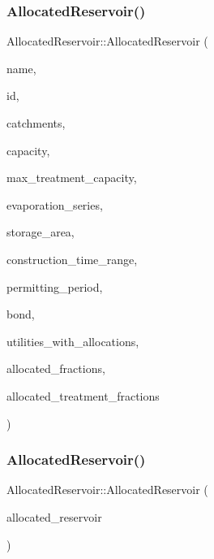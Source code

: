 \subsubsection{\texorpdfstring{Allocated\+Reservoir()}{AllocatedReservoir()}\hspace{0.1cm}{\footnotesize\ttfamily [4/5]}}
{\footnotesize\ttfamily Allocated\+Reservoir\+::\+Allocated\+Reservoir (\begin{DoxyParamCaption}\item[{const char $\ast$}]{name,  }\item[{const int}]{id,  }\item[{const vector$<$ \mbox{\hyperlink{classCatchment}{Catchment}} $\ast$$>$ \&}]{catchments,  }\item[{const double}]{capacity,  }\item[{const double}]{max\+\_\+treatment\+\_\+capacity,  }\item[{\mbox{\hyperlink{classEvaporationSeries}{Evaporation\+Series}} \&}]{evaporation\+\_\+series,  }\item[{double}]{storage\+\_\+area,  }\item[{const vector$<$ double $>$ \&}]{construction\+\_\+time\+\_\+range,  }\item[{double}]{permitting\+\_\+period,  }\item[{\mbox{\hyperlink{classBond}{Bond}} \&}]{bond,  }\item[{vector$<$ int $>$ $\ast$}]{utilities\+\_\+with\+\_\+allocations,  }\item[{vector$<$ double $>$ $\ast$}]{allocated\+\_\+fractions,  }\item[{vector$<$ double $>$ $\ast$}]{allocated\+\_\+treatment\+\_\+fractions }\end{DoxyParamCaption})}

\mbox{\label{classAllocatedReservoir_a59098eb446ada7a23e914543f3c419c0_a59098eb446ada7a23e914543f3c419c0}} 
\subsubsection{\texorpdfstring{Allocated\+Reservoir()}{AllocatedReservoir()}\hspace{0.1cm}{\footnotesize\ttfamily [5/5]}}
{\footnotesize\ttfamily Allocated\+Reservoir\+::\+Allocated\+Reservoir (\begin{DoxyParamCaption}\item[{const \mbox{\hyperlink{classAllocatedReservoir}{Allocated\+Reservoir}} \&}]{allocated\+\_\+reservoir }\end{DoxyParamCaption})}

